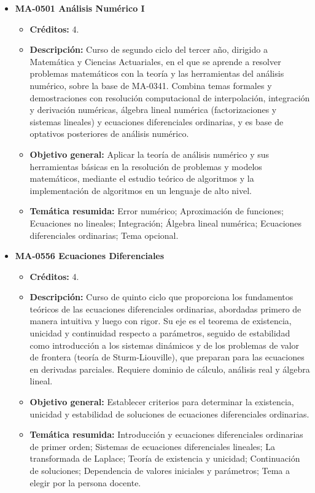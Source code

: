 \begin{itemize}[leftmargin=1.3em, itemsep=10pt, topsep=4pt, label={\color{Azul-UCR}$\blacksquare$}]
\item {\color{Azul-UCR}\textbf{MA-0501 Análisis Numérico I}}\par\nopagebreak\smallskip
\begin{itemize}[leftmargin=1.1em, itemsep=3pt, topsep=2pt, parsep=2pt, label={\textendash}]
\item \textbf{Créditos:} 4.
\item \textbf{Descripción:} Curso de segundo ciclo del tercer año, dirigido a Matemática y Ciencias Actuariales, en el que se aprende a resolver problemas matemáticos con la teoría y las herramientas del análisis numérico, sobre la base de MA-0341. Combina temas formales y demostraciones con resolución computacional de interpolación, integración y derivación numéricas, álgebra lineal numérica (factorizaciones y sistemas lineales) y ecuaciones diferenciales ordinarias, y es base de optativos posteriores de análisis numérico.
\item \textbf{Objetivo general:} Aplicar la teoría de análisis numérico y sus herramientas básicas en la resolución de problemas y modelos matemáticos, mediante el estudio teórico de algoritmos y la implementación de algoritmos en un lenguaje de alto nivel.
\item \textbf{Temática resumida:} Error numérico; Aproximación de funciones; Ecuaciones no lineales; Integración; Álgebra lineal numérica; Ecuaciones diferenciales ordinarias; Tema opcional.
\end{itemize}

\item {\color{Azul-UCR}\textbf{MA-0556 Ecuaciones Diferenciales}}\par\nopagebreak\smallskip
\begin{itemize}[leftmargin=1.1em, itemsep=3pt, topsep=2pt, parsep=2pt, label={\textendash}]
\item \textbf{Créditos:} 4.
\item \textbf{Descripción:} Curso de quinto ciclo que proporciona los fundamentos teóricos de las ecuaciones diferenciales ordinarias, abordadas primero de manera intuitiva y luego con rigor. Su eje es el teorema de existencia, unicidad y continuidad respecto a parámetros, seguido de estabilidad como introducción a los sistemas dinámicos y de los problemas de valor de frontera (teoría de Sturm-Liouville), que preparan para las ecuaciones en derivadas parciales. Requiere dominio de cálculo, análisis real y álgebra lineal.
\item \textbf{Objetivo general:} Establecer criterios para determinar la existencia, unicidad y estabilidad de soluciones de ecuaciones diferenciales ordinarias.
\item \textbf{Temática resumida:} Introducción y ecuaciones diferenciales ordinarias de primer orden; Sistemas de ecuaciones diferenciales lineales; La transformada de Laplace; Teoría de existencia y unicidad; Continuación de soluciones; Dependencia de valores iniciales y parámetros; Tema a elegir por la persona docente.
\end{itemize}


\end{itemize}
